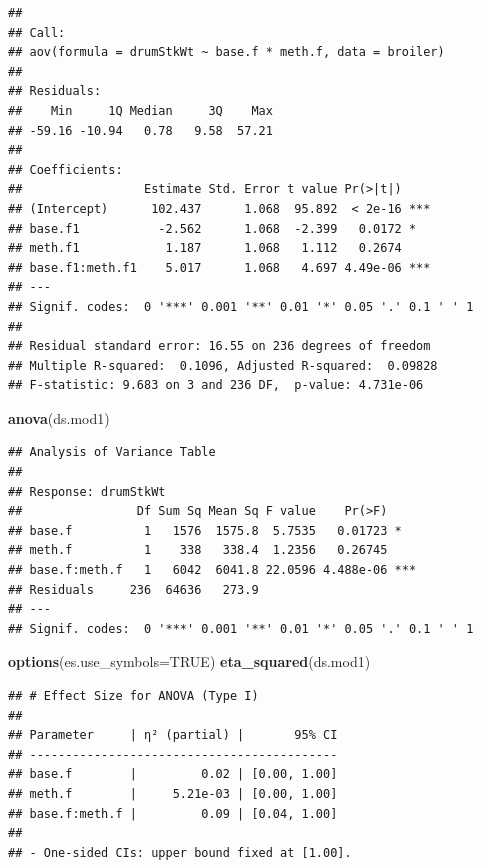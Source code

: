 \documentclass[
]{book}
\newenvironment{Shaded}{\begin{snugshade}}{\end{snugshade}}
\newcommand{\AttributeTok}[1]{\textcolor[rgb]{0.13,0.29,0.53}{#1}}
\newcommand{\ConstantTok}[1]{\textcolor[rgb]{0.56,0.35,0.01}{#1}}
\newcommand{\FunctionTok}[1]{\textcolor[rgb]{0.13,0.29,0.53}{\textbf{#1}}}
\newcommand{\NormalTok}[1]{#1}
\begin{document}
\begin{verbatim}
## 
## Call:
## aov(formula = drumStkWt ~ base.f * meth.f, data = broiler)
## 
## Residuals:
##    Min     1Q Median     3Q    Max 
## -59.16 -10.94   0.78   9.58  57.21 
## 
## Coefficients:
##                 Estimate Std. Error t value Pr(>|t|)    
## (Intercept)      102.437      1.068  95.892  < 2e-16 ***
## base.f1           -2.562      1.068  -2.399   0.0172 *  
## meth.f1            1.187      1.068   1.112   0.2674    
## base.f1:meth.f1    5.017      1.068   4.697 4.49e-06 ***
## ---
## Signif. codes:  0 '***' 0.001 '**' 0.01 '*' 0.05 '.' 0.1 ' ' 1
## 
## Residual standard error: 16.55 on 236 degrees of freedom
## Multiple R-squared:  0.1096, Adjusted R-squared:  0.09828 
## F-statistic: 9.683 on 3 and 236 DF,  p-value: 4.731e-06
\end{verbatim}

\begin{Shaded}
\begin{Highlighting}[]
\FunctionTok{anova}\NormalTok{(ds.mod1)}
\end{Highlighting}
\end{Shaded}

\begin{verbatim}
## Analysis of Variance Table
## 
## Response: drumStkWt
##                Df Sum Sq Mean Sq F value    Pr(>F)    
## base.f          1   1576  1575.8  5.7535   0.01723 *  
## meth.f          1    338   338.4  1.2356   0.26745    
## base.f:meth.f   1   6042  6041.8 22.0596 4.488e-06 ***
## Residuals     236  64636   273.9                      
## ---
## Signif. codes:  0 '***' 0.001 '**' 0.01 '*' 0.05 '.' 0.1 ' ' 1
\end{verbatim}

\begin{Shaded}
\begin{Highlighting}[]
\FunctionTok{options}\NormalTok{(}\AttributeTok{es.use\_symbols=}\ConstantTok{TRUE}\NormalTok{)}
\FunctionTok{eta\_squared}\NormalTok{(ds.mod1)}
\end{Highlighting}
\end{Shaded}

\begin{verbatim}
## # Effect Size for ANOVA (Type I)
## 
## Parameter     | η² (partial) |       95% CI
## -------------------------------------------
## base.f        |         0.02 | [0.00, 1.00]
## meth.f        |     5.21e-03 | [0.00, 1.00]
## base.f:meth.f |         0.09 | [0.04, 1.00]
## 
## - One-sided CIs: upper bound fixed at [1.00].
\end{verbatim}
\end{document}
